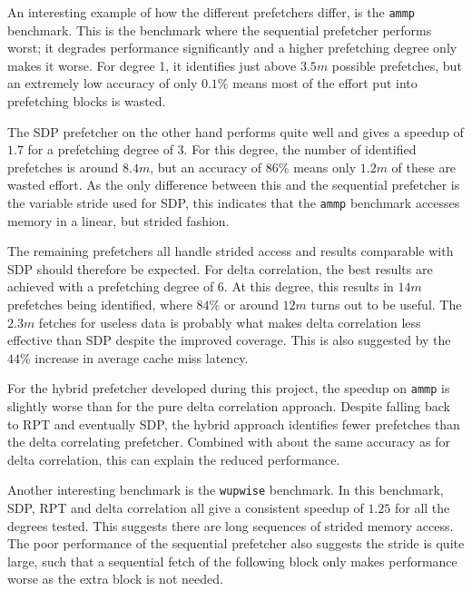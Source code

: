 An interesting example of how the different prefetchers differ, is the \texttt{ammp} benchmark.
This is the benchmark where the sequential prefetcher performs worst;
it degrades performance significantly and a higher prefetching degree only makes
it worse.
For degree 1, it identifies just above $3.5m$ possible prefetches, but an
extremely low accuracy of only $0.1\%$ means most of the effort put into
prefetching blocks is wasted.

The SDP prefetcher on the other hand performs quite well and gives a speedup of
$1.7$ for a prefetching degree of $3$.
For this degree, the number of identified prefetches is around $8.4m$, but an
accuracy of $86\%$ means only $1.2m$ of these are wasted effort.
As the only difference between this and the sequential prefetcher is the
variable stride used for SDP, this indicates that the \texttt{ammp} benchmark
accesses memory in a linear, but strided fashion.

The remaining prefetchers all handle strided access and results comparable with
SDP should therefore be expected.
For delta correlation, the best results are achieved with a prefetching degree of $6$.
At this degree, this results in $14m$ prefetches being identified, where $84\%$
or around $12m$ turns out to be useful.
The $2.3m$ fetches for useless data is probably what makes delta correlation
less effective than SDP despite the improved coverage.
This is also suggested by the $44\%$ increase in average cache miss latency.

For the hybrid prefetcher developed during this project, the speedup on \texttt{ammp} is slightly
worse than for the pure delta correlation approach.
Despite falling back to RPT and eventually SDP, the hybrid approach identifies
fewer prefetches than the delta correlating prefetcher.
Combined with about the same accuracy as for delta correlation, this can explain
the reduced performance.

Another interesting benchmark is the \texttt{wupwise} benchmark.
In this benchmark, SDP, RPT and delta correlation all give a consistent speedup
of $1.25$ for all the degrees tested.
This suggests there are long sequences of strided memory access.
The poor performance of the sequential prefetcher also suggests the stride is
quite large, such that a sequential fetch of the following block only makes
performance worse as the extra block is not needed.

